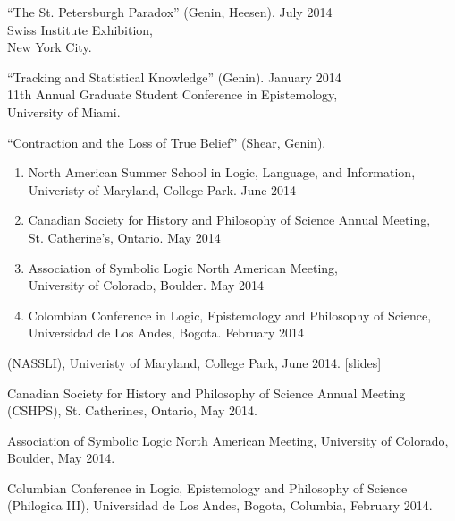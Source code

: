 \documentclass[12pt]{res} %
\begin{document}
\begin{resume}
``The St. Petersburgh Paradox'' (Genin, Heesen). \hfill July 2014\\
Swiss Institute Exhibition,\\ 
New York City. 

``Tracking and Statistical Knowledge'' (Genin). \hfill January 2014\\
 11th Annual Graduate Student Conference in Epistemology,\\
University of Miami. 

``Contraction and the Loss of True Belief'' (Shear, Genin).\\
\begin{enumerate}
\item North American Summer School in Logic, Language, and Information,\\ Univeristy of Maryland, College Park. \hfill June 2014
\item Canadian Society for History and Philosophy of Science Annual Meeting,\\ St. Catherine's, Ontario. \hfill May 2014
\item Association of Symbolic Logic North American Meeting,\\ University of Colorado, Boulder. \hfill May 2014
\item Colombian Conference in Logic, Epistemology and Philosophy of Science,\\ Universidad de Los Andes, Bogota. \hfill February 2014
\end{enumerate}
 (NASSLI), Univeristy of Maryland, College Park, June 2014. [slides]

Canadian Society for History and Philosophy of Science Annual Meeting (CSHPS), St. Catherines, Ontario, May 2014.

Association of Symbolic Logic North American Meeting, University of Colorado, Boulder, May 2014.

Columbian Conference in Logic, Epistemology and Philosophy of Science (Philogica III), Universidad de Los Andes, Bogota, Columbia, February 2014.


\vspace{0.2in} %



\end{resume}
\end{document}
